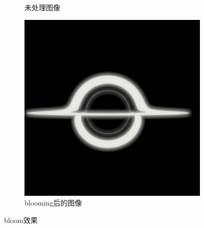 \begin{enumerate}
\begin{figure}[H]
\begin{subfigure}{.5\textwidth}
                  \caption{未处理图像}
                  \label{fig:no-bloom}
              \end{subfigure}%
              \begin{subfigure}{.5\textwidth}
                  \centering
                  \includegraphics[width=.8\linewidth]{images/bloom.png}
                  \caption{blooming后的图像}
                  \label{fig:bloomed}
              \end{subfigure}
              \caption{bloom效果}
          \end{figure}
\end{enumerate}

